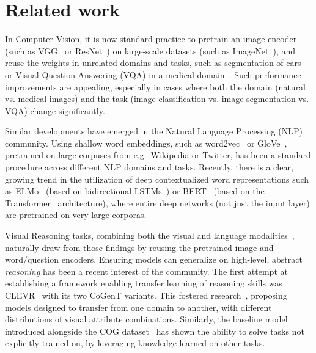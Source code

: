 \section{Related work}
\label{sec:related_work}

In Computer Vision, it is now standard practice to pretrain an image encoder (such as VGG~\cite{simonyan2014very} or ResNet~\cite{he2016deep}) on large-scale datasets (such as ImageNet~\cite{deng2009imagenet}), and reuse the weights in unrelated domains and tasks, such as segmentation of cars~\cite{iglovikov2018ternausnet} or Visual Question Answering (VQA) in a medical domain~\cite{kornuta2019leveraging}.
Such performance improvements are appealing, especially in cases where both the domain (natural vs. medical images) and the task (image classification vs. image segmentation vs. VQA) change significantly.

Similar developments have emerged in the Natural Language Processing (NLP) community.
Using shallow word embeddings, such as word2vec~\cite{mikolov2013distributed} or GloVe~\cite{pennington2014glove}, pretrained on large corpuses from e.g.\ Wikipedia or Twitter, has been a standard procedure across different NLP domains and tasks.
Recently, there is a clear, growing trend in the utilization of deep contextualized word representations such as ELMo~\cite{peters2018deep} (based on bidirectional LSTMs~\cite{hochreiter1997long}) or BERT~\cite{devlin2018bert} (based on the Transformer~\cite{vaswani2017attention} architecture), where entire deep networks (not just the input layer) are pretrained on very large corporas.

Visual Reasoning tasks, combining both the visual and language modalities~\cite{mogadala2019trends}, naturally draw from those findings by reusing the pretrained image and word/question encoders.
Ensuring models can generalize on high-level, abstract \emph{reasoning} has been a recent interest of the community.
The first attempt at establishing a framework enabling transfer learning of reasoning skills was CLEVR~\cite{johnson2017clevr} with its two CoGenT variants.
This fostered research~\cite{mascharka2018transparency,perez2018film,johnson2017inferring,marois2018transfer}, proposing models designed to transfer from one domain to another, with different distributions of visual attribute combinations.
Similarly, the baseline model introduced alongside the COG dataset~\cite{yang2018dataset} has shown the ability to solve tasks not explicitly trained on, by leveraging knowledge learned on other tasks.

